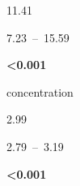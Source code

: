 \documentclass[
  letterpaper,
  DIV=11,
  numbers=noendperiod]{scrartcl}
\begin{document}
\begin{table}
\begin{minipage}[t]{\linewidth}
{\centering 

11.41

}

\end{minipage}%
\newline
\begin{minipage}[t]{\linewidth}

{\centering 

7.23~--~15.59

}

\end{minipage}%
\newline
\begin{minipage}[t]{\linewidth}

{\centering 

\textbf{\textless0.001}

}

\end{minipage}%
\newline
\begin{minipage}[t]{\linewidth}

{\centering 

concentration

}

\end{minipage}%
\newline
\begin{minipage}[t]{\linewidth}

{\centering 

2.99

}

\end{minipage}%
\newline
\begin{minipage}[t]{\linewidth}

{\centering 

2.79~--~3.19

}

\end{minipage}%
\newline
\begin{minipage}[t]{\linewidth}

{\centering 

\textbf{\textless0.001}

}

\end{minipage}%
\newline
\begin{minipage}[t]{\linewidth}

{\centering 

}
\end{minipage}
\end{table}
\end{document}
